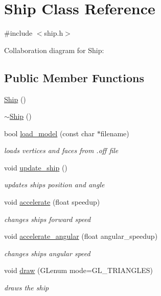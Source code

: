 \hypertarget{classShip}{}\section{Ship Class Reference}
\label{classShip}


{\ttfamily \#include $<$ship.\+h$>$}



Collaboration diagram for Ship\+:
\subsection*{Public Member Functions}
\begin{DoxyCompactItemize}
\item 
\hyperlink{classShip_ab7608fcfc4d27c678aacaf9bfd68a462}{Ship} ()
\item 
\hyperlink{classShip_a43cd6eeaffc11b49239b091621963a65}{$\sim$\+Ship} ()
\item 
bool \hyperlink{classShip_a34832cdc6cb1c67fa346b6903da62c81}{load\+\_\+model} (const char $\ast$filename)
\begin{DoxyCompactList}\small\item\em loads vertices and faces from .off file \end{DoxyCompactList}\item 
void \hyperlink{classShip_abece18ed5b9d72264a1392cce3ad0f63}{update\+\_\+ship} ()
\begin{DoxyCompactList}\small\item\em updates ships position and angle \end{DoxyCompactList}\item 
void \hyperlink{classShip_a2918a19717ac2417289d74ae2aa7d2ab}{accelerate} (float speedup)
\begin{DoxyCompactList}\small\item\em changes ship\textquotesingle{}s forward speed \end{DoxyCompactList}\item 
void \hyperlink{classShip_aef8f64c5d8a70e96151ab6fb9f09d6bb}{accelerate\+\_\+angular} (float angular\+\_\+speedup)
\begin{DoxyCompactList}\small\item\em changes ship\textquotesingle{}s angular speed \end{DoxyCompactList}\item 
void \hyperlink{classShip_a6e34e65bf743c2f50d4bf462da92e20a}{draw} (G\+Lenum mode=G\+L\+\_\+\+T\+R\+I\+A\+N\+G\+L\+ES)
\begin{DoxyCompactList}\small\item\em draws the ship \end{DoxyCompactList}\end{DoxyCompactItemize}
